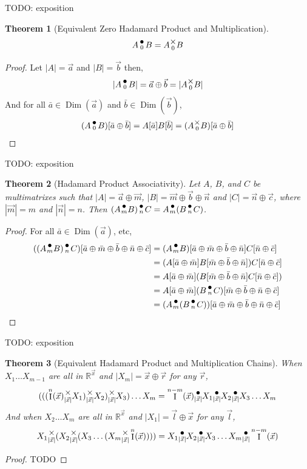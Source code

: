 \documentclass[12pt]{book}
\theoremstyle{plain}
\newtheorem{theorem}{Theorem}[chapter]
\theoremstyle{definition}
\theoremstyle{ppart}
\theoremstyle{case}
\theoremstyle{solution}
\DeclareMathOperator{\Dim}{Dim}
\DeclareMathOperator{\Ident}{I}
\newcommand{\mmult}[1]{\text{\raisebox{1ex}{$\underset{#1}{\times}$}}}
\newcommand{\dmult}[1]{\text{\raisebox{1ex}{$\underset{#1}{\,\bullet\,}$}}}
\begin{document}
TODO: exposition

\begin{theorem}[Equivalent Zero Hadamard Product and Multiplication]
\[ A \dmult{0} B = A \mmult{0} B \]
\end{theorem}
\begin{proof}
Let $|A| = \vec{a}$ and $|B| = \vec{b}$ then,
\[ |A \dmult{0} B| = \vec{a} \oplus \vec{b} = |A \mmult{0} B| \]
And for all $\bar{a} \in \Dim(\vec{a})$ and $\bar{b} \in \Dim(\vec{b})$,
\[ (A \dmult{0} B)[\bar{a} \oplus \bar{b}] = A[\bar{a}] B[\bar{b}] = (A \mmult{0} B)[\bar{a} \oplus \bar{b}] \]
\end{proof}

TODO: exposition

\begin{theorem}[Hadamard Product Associativity]
Let $A$, $B$, and $C$ be multimatrixes such that $|A| = \vec{a} \oplus \vec{m}$,
$|B| = \vec{m} \oplus \vec{b} \oplus \vec{n}$ and $|C| = \vec{n} \oplus \vec{c}$,
where $|\vec{m}| = m$ and $|\vec{n}| = n$.
Then $(A \dmult{m} B) \dmult{n} C = A \dmult{m} (B \dmult{n} C)$.
\end{theorem}
\begin{proof}
For all $\bar{a} \in \Dim(\vec{a})$, etc,
\begin{align*}
((A \dmult{m} B) \dmult{n} C)[\bar{a} \oplus \bar{m} \oplus \bar{b} \oplus \bar{n} \oplus \bar{c}]
  &= (A \dmult{m} B)[\bar{a} \oplus \bar{m} \oplus \bar{b} \oplus \bar{n}] C[\bar{n} \oplus \bar{c}] \\
  &= (A[\bar{a} \oplus \bar{m}] B[\bar{m} \oplus \bar{b} \oplus \bar{n}]) C[\bar{n} \oplus \bar{c}] \\
  &= A[\bar{a} \oplus \bar{m}] (B[\bar{m} \oplus \bar{b} \oplus \bar{n}] C[\bar{n} \oplus \bar{c}]) \\
  &= A[\bar{a} \oplus \bar{m}] (B \dmult{n} C)[\bar{m} \oplus \bar{b} \oplus \bar{n} \oplus \bar{c}] \\
  &= (A \dmult{m} (B \dmult{n} C))[\bar{a} \oplus \bar{m} \oplus \bar{b} \oplus \bar{n} \oplus \bar{c}]
\end{align*}
\end{proof}

TODO: exposition

\begin{theorem}[Equivalent Hadamard Product and Multiplication Chains]
When $X_1 \ldots X_{m-1}$ are all in $\mathbb{R}^{\vec{x}}$ and
$|X_m| = \vec{x} \oplus \vec{r}$ for any $\vec{r}$,
\[
  (((\Ident^n(\vec{x})
  \mmult{|\vec{x}|} X_1) \mmult{|\vec{x}|} X_2) \mmult{|\vec{x}|} X_3)
  \ldots X_m
  =
  \Ident^{n-m}(\vec{x})
  \dmult{|\vec{x}|} X_1 \dmult{|\vec{x}|} X_2 \dmult{|\vec{x}|} X_3
  \ldots X_m
\]
And when $X_2 \ldots X_m$ are all in $\mathbb{R}^{\vec{x}}$ and
$|X_1| = \vec{l} \oplus \vec{x}$ for any $\vec{l}$,
\[
  X_1 \mmult{|\vec{x}|} (X_2 \mmult{|\vec{x}|} (X_3
  \ldots (X_m \mmult{|\vec{x}|} 
  \Ident^n(\vec{x}))))
  =
  X_1 \dmult{|\vec{x}|} X_2 \dmult{|\vec{x}|} X_3
  \ldots X_m \dmult{|\vec{x}|} 
  \Ident^{n-m}(\vec{x})
\]
\end{theorem}
\begin{proof}
TODO 
\end{proof}
\end{document}

